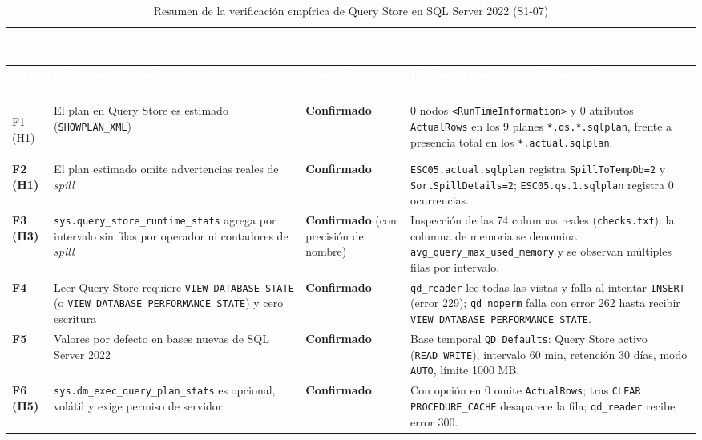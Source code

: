 \documentclass[12pt,a4paper]{article}
\begin{document}
\begingroup
{}
\scriptsize
\begin{longtable}{>{\bfseries}p{} p{} p{} p{}}
\toprule
\rowcolor{utbblue}
\textcolor{white}{\textbf{ID}} & \textcolor{white}{\textbf{Hallazgo o hipótesis evaluada}} & \textcolor{white}{\textbf{Veredicto empírico}} & \textcolor{white}{\textbf{Evidencia medida en el laboratorio}} \\
\midrule
\endfirsthead
\toprule
\rowcolor{utbblue}
\textcolor{white}{\textbf{ID}} & \textcolor{white}{\textbf{Hallazgo o hipótesis evaluada}} & \textcolor{white}{\textbf{Veredicto empírico}} & \textcolor{white}{\textbf{Evidencia medida en el laboratorio}} \\
\midrule
\endhead
\bottomrule
\caption{Resumen de la verificación empírica de Query Store en SQL Server 2022 (S1-07)}
\label{tab:hallazgos-f1-f8}
\endlastfoot
F1 (H1) & El plan en Query Store es estimado (\texttt{SHOWPLAN\_XML}) & \textbf{Confirmado} & 0 nodos \texttt{<RunTimeInformation>} y 0 atributos \texttt{ActualRows} en los 9 planes \texttt{*.qs.*.sqlplan}, frente a presencia total en los \texttt{*.actual.sqlplan}. \\
F2 (H1) & El plan estimado omite advertencias reales de \textit{spill} & \textbf{Confirmado} & \texttt{ESC05.actual.sqlplan} registra \texttt{SpillToTempDb=2} y \texttt{SortSpillDetails=2}; \texttt{ESC05.qs.1.sqlplan} registra 0 ocurrencias. \\
F3 (H3) & \texttt{sys.query\_store\_runtime\_stats} agrega por intervalo sin filas por operador ni contadores de \textit{spill} & \textbf{Confirmado} (con precisión de nombre) & Inspección de las 74 columnas reales (\texttt{checks.txt}): la columna de memoria se denomina \texttt{avg\_query\_max\_used\_memory} y se observan múltiples filas por intervalo. \\
F4 & Leer Query Store requiere \texttt{VIEW DATABASE STATE} (o \texttt{VIEW DATABASE PERFORMANCE STATE}) y cero escritura & \textbf{Confirmado} & \texttt{qd\_reader} lee todas las vistas y falla al intentar \texttt{INSERT} (error 229); \texttt{qd\_noperm} falla con error 262 hasta recibir \texttt{VIEW DATABASE PERFORMANCE STATE}. \\
F5 & Valores por defecto en bases nuevas de SQL Server 2022 & \textbf{Confirmado} & Base temporal \texttt{QD\_Defaults}: Query Store activo (\texttt{READ\_WRITE}), intervalo 60 min, retención 30 días, modo \texttt{AUTO}, límite 1000 MB. \\
F6 (H5) & \texttt{sys.dm\_exec\_query\_plan\_stats} es opcional, volátil y exige permiso de servidor & \textbf{Confirmado} & Con opción en 0 omite \texttt{ActualRows}; tras \texttt{CLEAR PROCEDURE\_CACHE} desaparece la fila; \texttt{qd\_reader} recibe error 300. \\

\end{longtable}
\end{document}
